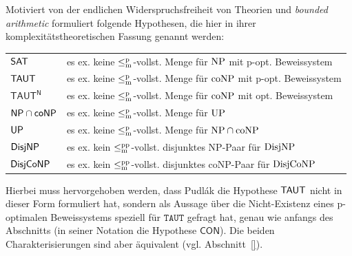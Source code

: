 Motiviert von der endlichen Widerspruchsfreiheit von Theorien und \emph{bounded arithmetic} formuliert \textcite{pudlak_incompleteness_2017} folgende Hypothesen, die hier in ihrer komplexitätstheoretischen Fassung genannt werden:\par
\bigskip
\begin{tabular}{l@{\quad:\quad}l}
    $\mathsf{SAT}$ & es ex. keine $\leq_\mathrm{m}^\mathrm{p}$-vollst. Menge für $\mathrm{NP}$ mit p-opt. Beweissystem\\
    $\mathsf{TAUT}$ & es ex. keine $\leq_\mathrm{m}^\mathrm{p}$-vollst. Menge für $\mathrm{coNP}$ mit p-opt. Beweissystem\\
    $\mathsf{TAUT^N}$ & es ex. keine $\leq_\mathrm{m}^\mathrm{p}$-vollst. Menge für $\mathrm{coNP}$ mit opt. Beweissystem\\
    $\mathsf{NP}{}\cap{}\mathsf{coNP}$ & es ex. keine $\leq_\mathrm{m}^\mathrm{p}$-vollst. Menge für $\mathrm{UP}$\\
    $\mathsf{UP}$ & es ex. keine $\leq_\mathrm{m}^\mathrm{p}$-vollst. Menge für $\mathrm{NP}\cap\mathrm{coNP}$\\
    $\mathsf{DisjNP}$ & es ex. kein $\leq_\mathrm{m}^\mathrm{pp}$-vollst. disjunktes NP-Paar für $\mathrm{DisjNP}$\\
    $\mathsf{DisjCoNP}$ & es ex. kein $\leq_\mathrm{m}^\mathrm{pp}$-vollst. disjunktes coNP-Paar für $\mathrm{DisjCoNP}$
\end{tabular}\par
\bigskip\noindent
Hierbei muss hervorgehoben werden, dass Pudlák die Hypothese $\mathsf{TAUT}$ nicht in dieser Form formuliert hat, sondern als Aussage über die Nicht-Existenz eines p-optimalen Beweissystems speziell für $\mathtt{TAUT}$ gefragt hat, genau wie anfangs des Abschnitts (in seiner Notation die Hypothese $\mathsf{CON}$). Die beiden Charakterisierungen sind aber äquivalent (vgl. Abschnitt~\ref{}).

